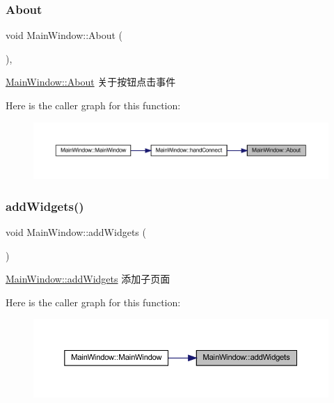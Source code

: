 \subsubsection{\texorpdfstring{About}{About}}
{\footnotesize\ttfamily void Main\+Window\+::\+About (\begin{DoxyParamCaption}{ }\end{DoxyParamCaption})\hspace{0.3cm}{\ttfamily [private]}, {\ttfamily [slot]}}



\mbox{\hyperlink{class_main_window_acb789dac6a35383ad1d7bb6f652c7cee}{Main\+Window\+::\+About}} 关于按钮点击事件 

Here is the caller graph for this function\+:
\nopagebreak
\begin{figure}[H]
\begin{center}
\leavevmode
\includegraphics[width=350pt]{class_main_window_acb789dac6a35383ad1d7bb6f652c7cee_icgraph}
\end{center}
\end{figure}
\mbox{\label{class_main_window_ae449e932d7b98f64803ef7e1c9c7cb82}} 
\subsubsection{\texorpdfstring{addWidgets()}{addWidgets()}}
{\footnotesize\ttfamily void Main\+Window\+::add\+Widgets (\begin{DoxyParamCaption}{ }\end{DoxyParamCaption})}



\mbox{\hyperlink{class_main_window_ae449e932d7b98f64803ef7e1c9c7cb82}{Main\+Window\+::add\+Widgets}} 添加子页面 

Here is the caller graph for this function\+:
\nopagebreak
\begin{figure}[H]
\begin{center}
\leavevmode
\includegraphics[width=350pt]{class_main_window_ae449e932d7b98f64803ef7e1c9c7cb82_icgraph}
\end{center}
\end{figure}
\mbox{\label{class_main_window_a86aa997699ba4fdf4d7b258a412315e5}} 
